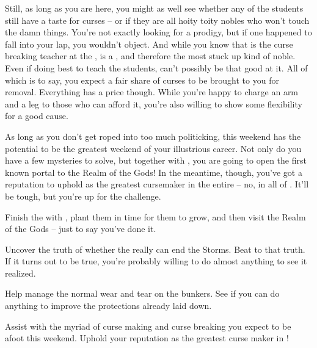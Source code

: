 \documentclass[char]{GL2020}
\begin{document}
Still, as long as you are here, you might as well see whether any of the students still have a taste for curses -- or if they are all hoity toity nobles who won’t touch the damn things. You’re not exactly looking for a prodigy, but if one happened to fall into your lap, you wouldn’t object. And while you know that \cPrince{} is the curse breaking teacher at the \pSc{}, \cPrince{} is a \cPrince{\Heir}, and therefore the most stuck up kind of noble. Even if \cPrince{\they} \cPrince{\were} doing \cPrince{\their} best to teach the students, \cPrince{} can’t possibly be that good at it. All of which is to say, you expect a fair share of curses to be brought to you for removal. Everything has a price though. While you’re happy to charge an arm and a leg to those who can afford it, you’re also willing to show some flexibility for a good cause.

As long as you don’t get roped into too much politicking, this weekend has the potential to be the greatest weekend of your illustrious career. Not only do you have a few mysteries to solve, but together with \cFlowPriest{}, you are going to open the first known portal to the Realm of the Gods! In the meantime, though, you’ve got a reputation to uphold as the greatest cursemaker in the entire \pFarm{} -- no, in all of \pEarth{}. It’ll be tough, but you’re up for the challenge.

\begin{itemz}[Goals]
	\item Finish the \iBeansNB{} with \cFlowPriest{}, plant them in time for them to grow, and then visit the Realm of the Gods -- just to say you’ve done it.
	\item Uncover the truth of whether the \pTech{} really can end the Storms. Beat \cHedonist{} to that truth. If it turns out to be true, you’re probably willing to do almost anything to see it realized.
	\item Help \cBunker{} manage the normal wear and tear on the bunkers. See if you can do anything to improve the protections already laid down.
	\item Assist with the myriad of curse making and curse breaking you expect to be afoot this weekend. Uphold your reputation as the greatest curse maker in \pEarth{}!
\end{itemz}

\begin{itemz}[Notes]
	\item 
\end{itemz}
\end{document}
